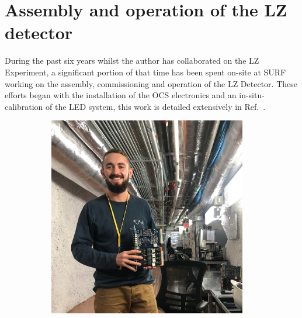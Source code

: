 \section{Assembly and operation of the LZ detector}\label{sec:LZ/LZAssembly}
During the past six years whilst the author has collaborated on the LZ Experiment, a significant portion of that time has been spent on-site at SURF working on the assembly, commissioning and operation of the LZ Detector. These efforts began with the installation of the OCS electronics and an in-situ-calibration of the LED system, this work is detailed extensively in Ref.~\cite{hbirch:thesis}.
\begin{figure}[!ht]
     \centering
     \begin{subfigure}{0.47\textwidth}
         \centering
         \includegraphics[width=0.95\textwidth]{figures/LZ/OCSMotherboardCC.png}
         \label{fig:LZ/Gonk0}
     \end{subfigure}
     \begin{subfigure}{0.47\textwidth}
         \centering

\end{subfigure}
\end{figure}

